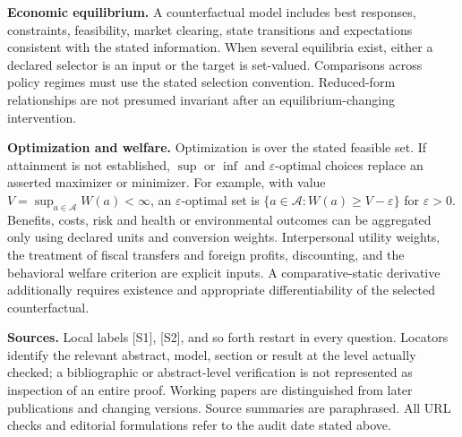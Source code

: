 \documentclass[11pt,a4paper]{article}
\begin{document}
\textbf{Economic equilibrium.} A counterfactual model includes best responses, constraints, feasibility, market clearing, state transitions and expectations consistent with the stated information. When several equilibria exist, either a declared selector is an input or the target is set-valued. Comparisons across policy regimes must use the stated selection convention. Reduced-form relationships are not presumed invariant after an equilibrium-changing intervention.

\textbf{Optimization and welfare.} Optimization is over the stated feasible set. If attainment is not established, $\sup$ or $\inf$ and $\varepsilon$-optimal choices replace an asserted maximizer or minimizer. For example, with value $V=\sup_{a\in\mathcal A}W(a)<\infty$, an $\varepsilon$-optimal set is $\{a\in\mathcal A:W(a)\geq V-\varepsilon\}$ for $\varepsilon>0$. Benefits, costs, risk and health or environmental outcomes can be aggregated only using declared units and conversion weights. Interpersonal utility weights, the treatment of fiscal transfers and foreign profits, discounting, and the behavioral welfare criterion are explicit inputs. A comparative-static derivative additionally requires existence and appropriate differentiability of the selected counterfactual.

\textbf{Sources.} Local labels [S1], [S2], and so forth restart in every question. Locators identify the relevant abstract, model, section or result at the level actually checked; a bibliographic or abstract-level verification is not represented as inspection of an entire proof. Working papers are distinguished from later publications and changing versions. Source summaries are paraphrased. All URL checks and editorial formulations refer to the audit date stated above.
\end{document}
